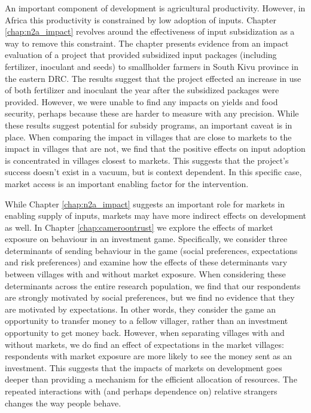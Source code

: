 An important component of development is agricultural productivity. However, in Africa this productivity is constrained by low adoption of inputs. Chapter \ref{chap:n2a_impact} revolves around the effectiveness of input subsidization as a way to remove this constraint. The chapter presents evidence from an impact evaluation of a project that provided subsidized input packages (including fertilizer, inoculant and seeds) to smallholder farmers in South Kivu province in the eastern DRC. The results suggest that the project effected an increase in use of both fertilizer and inoculant the year after the subsidized packages were provided. However, we were unable to find any impacts on yields and food security, perhaps because these are harder to measure with any precision. While these results suggest potential for subsidy programs, an important caveat is in place. When comparing the impact in villages that are close to markets to the impact in villages that are not, we find that the positive effects on input adoption is concentrated in villages closest to markets. This suggests that the project's success doesn't exist in a vacuum, but is context dependent. In this specific case, market access is an important enabling factor for the intervention.

While Chapter \ref{chap:n2a_impact} suggests an important role for markets in enabling supply of inputs, markets may have more indirect effects on development as well. In  Chapter \ref{chap:cameroontrust} we explore the effects of market exposure on behaviour in an investment game. Specifically, we consider three determinants of sending behaviour in the game (social preferences, expectations and risk preferences) and examine how the effects of these determinants vary between villages with and without market exposure. When considering these determinants across the entire research population, we find that our respondents are strongly motivated by social preferences, but we find no evidence that they are motivated by expectations. In other words, they consider the game an opportunity to transfer money to a fellow villager, rather than an investment opportunity to get money back. However, when separating villages with and without markets, we do find an effect of expectations in the market villages: respondents with market exposure are more likely to see the money sent as an investment. This suggests that the impacts of markets on development goes deeper than providing a mechanism for the efficient allocation of resources. The repeated interactions with (and perhaps dependence on) relative strangers changes the way people behave. 

